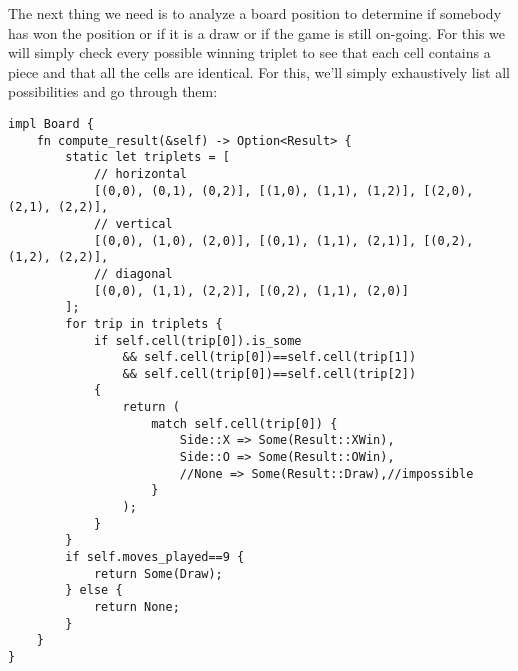 \documentclass[10pt,dvipdfmx]{report}
\begin{document}
The next thing we need is to analyze a board position to determine if somebody has won the position or
if it is a draw or if the game is still on-going.  For this we will simply check every possible
winning triplet to see that each cell contains a piece and that all the cells are identical.
For this, we'll simply exhaustively list all possibilities and go through them:
{\scriptsize\begin{verbatim}
impl Board {
    fn compute_result(&self) -> Option<Result> {
        static let triplets = [
            // horizontal
            [(0,0), (0,1), (0,2)], [(1,0), (1,1), (1,2)], [(2,0), (2,1), (2,2)],
            // vertical
            [(0,0), (1,0), (2,0)], [(0,1), (1,1), (2,1)], [(0,2), (1,2), (2,2)],
            // diagonal
            [(0,0), (1,1), (2,2)], [(0,2), (1,1), (2,0)]
        ];
        for trip in triplets {
            if self.cell(trip[0]).is_some
                && self.cell(trip[0])==self.cell(trip[1])
                && self.cell(trip[0])==self.cell(trip[2])
            {
                return (
                    match self.cell(trip[0]) {
                        Side::X => Some(Result::XWin),
                        Side::O => Some(Result::OWin),
                        //None => Some(Result::Draw),//impossible
                    }
                );
            }
        }
        if self.moves_played==9 {
            return Some(Draw);
        } else {
            return None;
        }
    }
}
\end{verbatim}}
\end{document}

